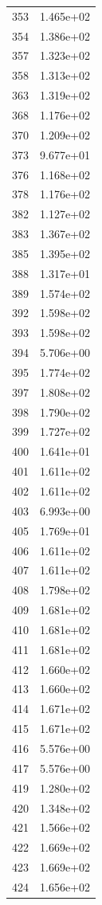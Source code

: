 \documentclass[12pt]{article}
\begin{document}
\begin{longtable}{@{}cc@{}}
353 & 1.465e+02 \\
354 & 1.386e+02 \\
357 & 1.323e+02 \\
358 & 1.313e+02 \\
363 & 1.319e+02 \\
368 & 1.176e+02 \\
370 & 1.209e+02 \\
373 & 9.677e+01 \\
376 & 1.168e+02 \\
378 & 1.176e+02 \\
382 & 1.127e+02 \\
383 & 1.367e+02 \\
385 & 1.395e+02 \\
388 & 1.317e+01 \\
389 & 1.574e+02 \\
392 & 1.598e+02 \\
393 & 1.598e+02 \\
394 & 5.706e+00 \\
395 & 1.774e+02 \\
397 & 1.808e+02 \\
398 & 1.790e+02 \\
399 & 1.727e+02 \\
400 & 1.641e+01 \\
401 & 1.611e+02 \\
402 & 1.611e+02 \\
403 & 6.993e+00 \\
405 & 1.769e+01 \\
406 & 1.611e+02 \\
407 & 1.611e+02 \\
408 & 1.798e+02 \\
409 & 1.681e+02 \\
410 & 1.681e+02 \\
411 & 1.681e+02 \\
412 & 1.660e+02 \\
413 & 1.660e+02 \\
414 & 1.671e+02 \\
415 & 1.671e+02 \\
416 & 5.576e+00 \\
417 & 5.576e+00 \\
419 & 1.280e+02 \\
420 & 1.348e+02 \\
421 & 1.566e+02 \\
422 & 1.669e+02 \\
423 & 1.669e+02 \\
424 & 1.656e+02 \\

\end{longtable}
\end{document}
